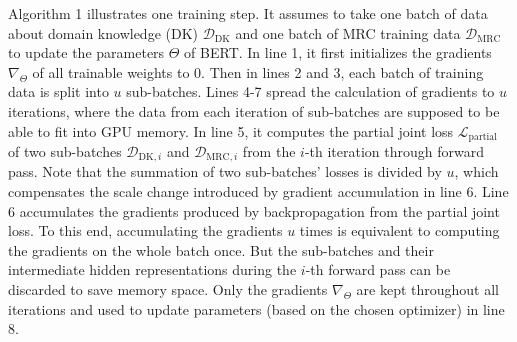
Algorithm 1 illustrates one training step. It assumes to take one batch of data about domain knowledge (DK) $\mathcal{D}_\text{DK}$ and one batch of MRC training data $\mathcal{D}_\text{MRC}$ to update the parameters $\Theta$ of BERT.
In line 1, it first initializes the gradients $\nabla_\Theta$ of all trainable weights to 0. Then in lines 2 and 3, each batch of training data is split into $u$ sub-batches. Lines 4-7 spread the calculation of gradients to $u$ iterations, where the data from each iteration of sub-batches are supposed to be able to fit into GPU memory.
In line 5, it computes the partial joint loss $\mathcal{L}_\text{partial}$ of two sub-batches $\mathcal{D}_{\text{DK}, i}$ and $\mathcal{D}_{\text{MRC}, i}$ from the $i$-th iteration through forward pass.
Note that the summation of two sub-batches' losses is divided by $u$, which compensates the scale change introduced by gradient accumulation in line 6.
Line 6 accumulates the gradients produced by backpropagation from the partial joint loss. To this end, accumulating the gradients $u$ times is equivalent to computing the gradients on the whole batch once. But the sub-batches and their intermediate hidden representations during the $i$-th forward pass can be discarded to save memory space.
Only the gradients $\nabla_\Theta$ are kept throughout all iterations and used to update parameters (based on the chosen optimizer) in line 8.

